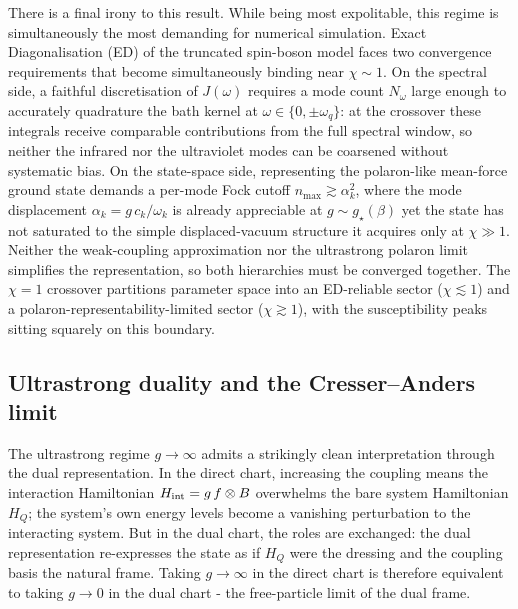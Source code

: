 There is a final irony to this result.  While being most expolitable, this regime is simultaneously the most demanding for
numerical simulation.  Exact Diagonalisation (ED) of the truncated spin-boson
model faces two convergence requirements that become simultaneously binding
near $\chi\sim 1$.  On the spectral side, a faithful discretisation of $J(\omega)$
requires a mode count $N_\omega$ large enough to accurately quadrature the bath
kernel at $\omega\in\{0,\pm\omega_q\}$: at the crossover these integrals receive
comparable contributions from the full spectral window, so neither the infrared
nor the ultraviolet modes can be coarsened without systematic bias.  On the
state-space side, representing the polaron-like mean-force ground state demands
a per-mode Fock cutoff $n_{\max}\gtrsim\alpha_k^2$, where the mode displacement
$\alpha_k = g\,c_k/\omega_k$ is already appreciable at $g\sim g_\star(\beta)$
yet the state has not saturated to the simple displaced-vacuum structure it
acquires only at $\chi\gg 1$.  Neither the weak-coupling approximation nor the
ultrastrong polaron limit simplifies the representation, so both hierarchies
must be converged together.  The $\chi=1$ crossover partitions parameter
space into an ED-reliable sector ($\chi\lesssim 1$) and a
polaron-representability-limited sector ($\chi\gtrsim 1$), with the
susceptibility peaks sitting squarely on this boundary. 

 
\subsection{Ultrastrong duality and the Cresser--Anders limit}
\label{subsec:limits}

The ultrastrong regime $g\to\infty$ admits a strikingly clean interpretation
through the dual representation. In the direct chart, increasing the coupling
means the interaction Hamiltonian $H_{\rm int}=g\,f\otimes B$ overwhelms the
bare system Hamiltonian $H_Q$; the system's own energy levels become a
vanishing perturbation to the interacting system. But in the dual chart, the
roles are exchanged: the dual representation re-expresses the state as if
$H_Q$ were the dressing and the coupling basis the natural frame. Taking
$g\to\infty$ in the direct chart is therefore equivalent to taking $g\to 0$ in
the dual chart - the free-particle limit of the dual frame.

